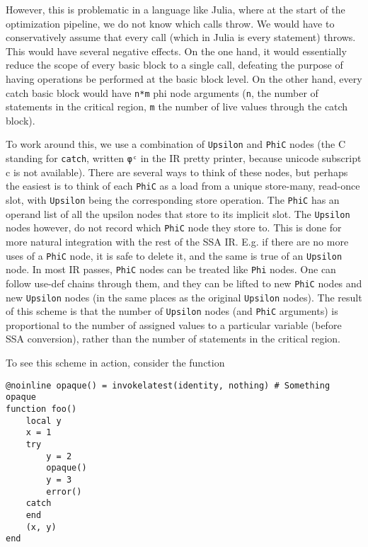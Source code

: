 However, this is problematic in a language like Julia, where at the start of the optimization pipeline, we do not know which calls throw. We would have to conservatively assume that every call (which in Julia is every statement) throws. This would have several negative effects. On the one hand, it would essentially reduce the scope of every basic block to a single call, defeating the purpose of having operations be performed at the basic block level. On the other hand, every catch basic block would have \texttt{n*m} phi node arguments (\texttt{n}, the number of statements in the critical region, \texttt{m} the number of live values through the catch block).



To work around this, we use a combination of \texttt{Upsilon} and \texttt{PhiC} nodes (the C standing for \texttt{catch}, written \texttt{φᶜ} in the IR pretty printer, because unicode subscript c is not available). There are several ways to think of these nodes, but perhaps the easiest is to think of each \texttt{PhiC} as a load from a unique store-many, read-once slot, with \texttt{Upsilon} being the corresponding store operation. The \texttt{PhiC} has an operand list of all the upsilon nodes that store to its implicit slot. The \texttt{Upsilon} nodes however, do not record which \texttt{PhiC} node they store to. This is done for more natural integration with the rest of the SSA IR. E.g. if there are no more uses of a \texttt{PhiC} node, it is safe to delete it, and the same is true of an \texttt{Upsilon} node. In most IR passes, \texttt{PhiC} nodes can be treated like \texttt{Phi} nodes. One can follow use-def chains through them, and they can be lifted to new \texttt{PhiC} nodes and new \texttt{Upsilon} nodes (in the same places as the original \texttt{Upsilon} nodes). The result of this scheme is that the number of \texttt{Upsilon} nodes (and \texttt{PhiC} arguments) is proportional to the number of assigned values to a particular variable (before SSA conversion), rather than the number of statements in the critical region.



To see this scheme in action, consider the function




\begin{verbatim}
@noinline opaque() = invokelatest(identity, nothing) # Something opaque
function foo()
    local y
    x = 1
    try
        y = 2
        opaque()
        y = 3
        error()
    catch
    end
    (x, y)
end
\end{verbatim}



